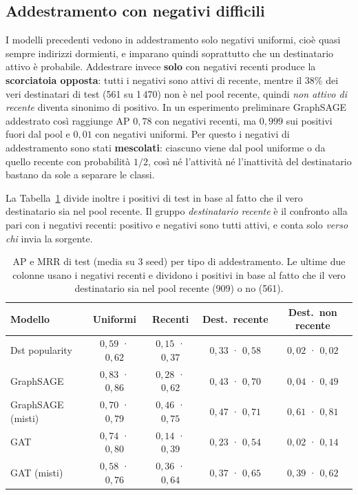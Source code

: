 \documentclass[11pt]{article}
\begin{document}
\subsection{Addestramento con negativi difficili}\label{sec:negativi_misti}
I modelli precedenti vedono in addestramento solo negativi uniformi, cioè
quasi sempre indirizzi dormienti, e imparano quindi soprattutto che un
destinatario attivo è probabile. Addestrare invece \textbf{solo} con negativi
recenti produce la \textbf{scorciatoia opposta}: tutti i negativi sono attivi di
recente, mentre il 38\% dei veri destinatari di test (561 su 1\,470) non è
nel pool recente, quindi \emph{non attivo di recente} diventa sinonimo di
positivo. In un esperimento preliminare GraphSAGE addestrato così raggiunge
AP $0{,}78$ con negativi recenti, ma $0{,}999$ sui positivi fuori dal pool
e $0{,}01$ con negativi uniformi. Per questo i negativi di
addestramento sono stati \textbf{mescolati}: ciascuno viene dal pool uniforme
o da quello recente con probabilità $1/2$, così né l'attività né
l'inattività del destinatario bastano da sole a separare le classi.

La Tabella~\ref{tab:negativi_misti} divide inoltre i positivi di test in
base al fatto che il vero destinatario sia nel pool recente. Il gruppo
\emph{destinatario recente} è il confronto alla pari con i negativi
recenti: positivo e negativi sono tutti attivi, e conta solo \emph{verso
chi} invia la sorgente.

\begin{table}[H]
\centering
\caption{AP e MRR di test (media su 3 seed) per tipo di addestramento. Le
ultime due colonne usano i negativi recenti e dividono i positivi in base
al fatto che il vero destinatario sia nel pool recente (909) o no (561).}
\label{tab:negativi_misti}
\begin{tabular}{lcccc}
\toprule
Modello & Uniformi & Recenti & Dest.\ recente & Dest.\ non recente \\
\midrule
Dst popularity       & $0{,}59$ · $0{,}62$ & $0{,}15$ · $0{,}37$ & $0{,}33$ · $0{,}58$ & $0{,}02$ · $0{,}02$ \\
GraphSAGE            & $0{,}83$ · $0{,}86$ & $0{,}28$ · $0{,}62$ & $0{,}43$ · $0{,}70$ & $0{,}04$ · $0{,}49$ \\
GraphSAGE (misti)    & $0{,}70$ · $0{,}79$ & $0{,}46$ · $0{,}75$ & $0{,}47$ · $0{,}71$ & $0{,}61$ · $0{,}81$ \\
GAT                  & $0{,}74$ · $0{,}80$ & $0{,}14$ · $0{,}39$ & $0{,}23$ · $0{,}54$ & $0{,}02$ · $0{,}14$ \\
GAT (misti)          & $0{,}58$ · $0{,}76$ & $0{,}36$ · $0{,}64$ & $0{,}37$ · $0{,}65$ & $0{,}39$ · $0{,}62$ \\
\bottomrule
\end{tabular}
\end{table}
\end{document}
